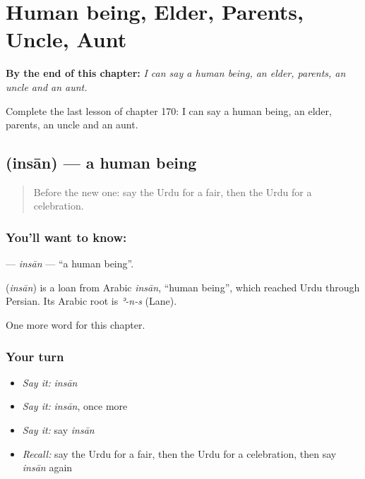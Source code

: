 
\chapter{Human being, Elder, Parents, Uncle, Aunt}
\label{ch:ur-human-being-elder-parents-uncle-aunt}

\begin{chapteropening}
\textbf{By the end of this chapter:} \emph{I can say a human being, an elder, parents, an uncle and an aunt.}

Complete the last lesson of chapter 170: I can say a human being, an elder, parents, an uncle and an aunt.
\end{chapteropening}

\section[\texorpdfstring{\ur{انسان} (insān)}{انسان (insān)}]{ (insān) — a human being}

\label{lesson:UR-C170-insan}



\begin{quote}
Before the new one: say the Urdu for a fair, then the Urdu for a celebration.
\end{quote}

\subsection*{You'll want to know: }
\textbf{} — \emph{insān} — \textquotedblleft{}a human being\textquotedblright{}.

\begin{cousinweb}
\textbf{} (\emph{insān}) is a loan from Arabic \emph{insān}, \textquotedblleft{}human being\textquotedblright{}, which reached Urdu through Persian. Its Arabic root is \emph{ʾ-n-s} (Lane).
\end{cousinweb}

\begin{grammarlens}[title={What you've built}]
One more word for this chapter.
\end{grammarlens}

\subsection*{Your turn}
\begin{itemize}
\raggedright
  \item \emph{Say it:} \emph{insān}
  \item \emph{Say it:} \emph{insān}, once more
  \item \emph{Say it:} say \emph{insān}
  \item \emph{Recall:} say the Urdu for a fair, then the Urdu for a celebration, then say \emph{insān} again
\end{itemize}

